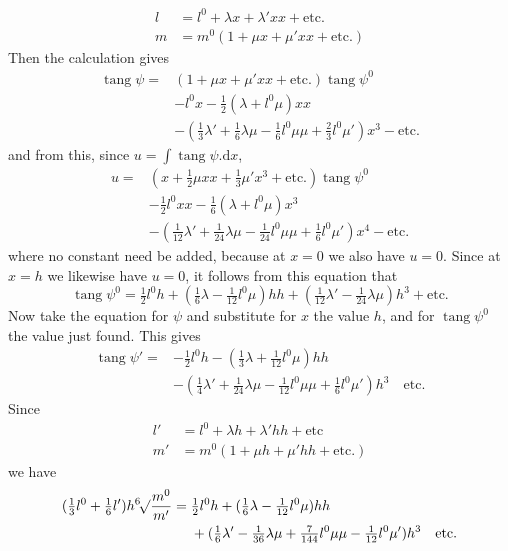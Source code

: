%
\[
\begin{aligned}
l&=l^0+\lambda x+\lambda'xx+\text{etc.}\\
m&=m^0(1+\mu x+\mu'xx+\text{etc.})
\end{aligned}
\]
Then the calculation gives
\[
\begin{aligned}
\operatorname{tang}\psi={}&(1+\mu x+\mu'xx+\text{etc.})\operatorname{tang}\psi^0\\
&-l^0x-\tfrac{1}{2}(\lambda+l^0\mu)xx\\
&-(\tfrac{1}{3}\lambda'+\tfrac{1}{6}\lambda\mu-\tfrac{1}{6}l^0\mu\mu+\tfrac{2}{3}l^0\mu')x^3-\text{etc.}
\end{aligned}
\]
and from this, since \(u=\int\operatorname{tang}\psi\mathord{.}\mathrm{d}x\),
\[
\begin{aligned}
u={}&(x+\tfrac{1}{2}\mu xx+\tfrac{1}{3}\mu'x^3+\text{etc.})\operatorname{tang}\psi^0\\
&-\tfrac{1}{2}l^0xx-\tfrac{1}{6}(\lambda+l^0\mu)x^3\\
&-(\tfrac{1}{12}\lambda'+\tfrac{1}{24}\lambda\mu-\tfrac{1}{24}l^0\mu\mu+\tfrac{1}{6}l^0\mu')x^4-\text{etc.}
\end{aligned}
\]
where no constant need be added, because at \(x=0\) we also have \(u=0\). Since at \(x=h\) we likewise have \(u=0\), it follows from this equation that
\[
\operatorname{tang}\psi^0=\tfrac{1}{2}l^0h+(\tfrac{1}{6}\lambda-\tfrac{1}{12}l^0\mu)hh+(\tfrac{1}{12}\lambda'-\tfrac{1}{24}\lambda\mu)h^3+\text{etc.}
\]
Now take the equation for \(\psi\) and substitute for \(x\) the value \(h\), and for \(\operatorname{tang}\psi^0\) the value just found. This gives
\[
\begin{aligned}
\operatorname{tang}\psi'={}&-\tfrac{1}{2}l^0h-(\tfrac{1}{3}\lambda+\tfrac{1}{12}l^0\mu)hh\\
&-(\tfrac{1}{4}\lambda'+\tfrac{1}{24}\lambda\mu-\tfrac{1}{12}l^0\mu\mu+\tfrac{1}{6}l^0\mu')h^3\quad\text{etc.}
\end{aligned}
\]
Since
\[
\begin{aligned}
l'&=l^0+\lambda h+\lambda'hh+\text{etc}\\
m'&=m^0(1+\mu h+\mu'hh+\text{etc.})
\end{aligned}
\]
we have
\[
\begin{aligned}
(\tfrac{1}{3}l^0+\tfrac{1}{6}l')h\BareRoot[6]{\frac{m^0}{m'}}={}&\tfrac{1}{2}l^0h+(\tfrac{1}{6}\lambda-\tfrac{1}{12}l^0\mu)hh\\
&+(\tfrac{1}{6}\lambda'-\tfrac{1}{36}\lambda\mu+\tfrac{7}{144}l^0\mu\mu-\tfrac{1}{12}l^0\mu')h^3\quad\text{etc.}
\end{aligned}
\]
